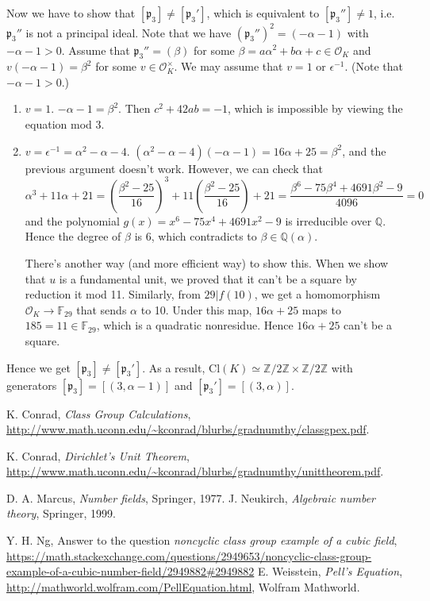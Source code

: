 \documentclass{article}
\newcommand{\Cl}{\mathrm{Cl}}
\begin{document}
Now we have to show that $[\mathfrak{p}_{3}]\neq [\mathfrak{p}_{3}']$, which is equivalent to $[\mathfrak{p}_{3}'']\neq 1$, i.e. $\mathfrak{p}_{3}''$ is not a principal ideal. 
Note that we have $(\mathfrak{p}_{3}'')^{2}  = (-\alpha - 1)$ with $-\alpha - 1 >0$. 
Assume that $\mathfrak{p}_{3}'' = (\beta)$ for some $\beta = a\alpha^{2} + b\alpha + c\in \mathcal{O}_{K}$ and $v(-\alpha - 1) = \beta^{2}$ for some $v\in \mathcal{O}_{K}^{\times}$. We may assume that $v = 1$ or $\epsilon^{-1}$. (Note that $-\alpha - 1  > 0$.)
\begin{enumerate}
\item $v = 1$. $-\alpha - 1 = \beta^{2}$. Then $c^{2} + 42ab = -1$, which is impossible by viewing the equation mod 3.
\item $v = \epsilon^{-1} = \alpha^{2} -\alpha - 4$. $(\alpha^{2} -\alpha - 4)(-\alpha - 1) = 16\alpha + 25=\beta^{2}$, and the previous argument doesn't work. However, we can check that 
$$
\alpha^{3} + 11\alpha + 21 = \left(\frac{\beta^{2} - 25}{16}\right)^{3} + 11 \left(\frac{\beta^{2} - 25}{16}\right) + 21 = \frac{\beta^{6} - 75\beta^{4} +4691\beta^{2} - 9}{4096} = 0
$$
and the polynomial $g(x) = x^{6} - 75x^{4} + 4691 x^{2} - 9$ is irreducible over $\mathbb{Q}$. Hence the degree of $\beta$ is 6, which contradicts to $\beta\in \mathbb{Q}(\alpha)$. 

There's another way (and more efficient way) to show this. When we show that $u$ is a fundamental unit, we proved that it can't be a square by reduction it mod 11. Similarly, from $29|f(10)$, we get a homomorphism $\mathcal{O}_{K}\to \mathbb{F}_{29}$ that sends $\alpha$ to 10. 
Under this map, $16\alpha + 25$ maps to $185 = 11\in \mathbb{F}_{29}$, which is a quadratic nonresidue. Hence $16\alpha +25$ can't be a square. 
\end{enumerate}
Hence we get $[\mathfrak{p}_{3}]\neq [\mathfrak{p}_{3}']$. 
As a result, $\Cl(K)\simeq \mathbb{Z}/2\mathbb{Z} \times \mathbb{Z}/2\mathbb{Z}$ with generators $[\mathfrak{p}_{3}] = [(3, \alpha -1)]$ and $[\mathfrak{p}_{3}'] = [(3, \alpha)]$. 





\begin{thebibliography}{10}
K. Conrad, \emph{Class Group Calculations}, \url{http://www.math.uconn.edu/~kconrad/blurbs/gradnumthy/classgpex.pdf}.

K. Conrad, \emph{Dirichlet's Unit Theorem}, \url{http://www.math.uconn.edu/~kconrad/blurbs/gradnumthy/unittheorem.pdf}.

D. A. Marcus, \emph{Number fields}, Springer, 1977. 
J. Neukirch, \emph{Algebraic number theory}, Springer, 1999. 

Y. H. Ng, Answer to the question \emph{noncyclic class group example of a cubic field}, \url{https://math.stackexchange.com/questions/2949653/noncyclic-class-group-example-of-a-cubic-number-field/2949882#2949882}
E. Weisstein, \emph{Pell's Equation}, \url{http://mathworld.wolfram.com/PellEquation.html}, Wolfram Mathworld. 

\end{thebibliography}
\end{document}
